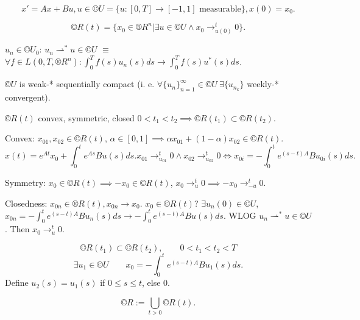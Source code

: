 \documentclass[12pt]{article}					%
\begin{document}
\begin{poznamka}
	$$ x' = Ax + Bu, u \in ©U = \{u: [0, T] \rightarrow [-1, 1] \text{ measurable}\}, x(0) = x_0. $$
\end{poznamka}

\begin{definice}
	$$ ©R(t) = \{x_0 \in ®R^n | \exists u \in ©U \land x_0 \rightarrow_{u(0)}^t 0\}. $$
\end{definice}

\begin{definice}
	$u_n \in ©U_0$: $u_n \rightharpoonup^* u \in ©U$ $≡$ $\forall f \in L(0, T, ®R^n): \int_0^T f(s) u_n(s) ds \rightarrow \int_0^T f(s) u^*(s) ds$.
\end{definice}

\begin{veta}[Alaoglu]
	$©U$ is weak-* sequentially compact (i. e. $\forall \{u_n\}_{n=1}^∞ \in ©U\ \exists \{u_{n_k}\}$ weekly-* convergent).
\end{veta}

\begin{veta}
	$©R(t)$ convex, symmetric, closed $0 < t_1 < t_2 \implies ©R(t_1) \subset ©R(t_2)$.

	\begin{dukazin}
		Convex: $x_{01}, x_{02} \in ©R(t)$, $\alpha \in [0, 1] \implies \alpha x_{01} + (1 - \alpha)x_{02} \in ©R(t)$.
		$$ x(t) = e^{At} x_0 + \int_0^t e^{As} B u(s) ds. x_{01} \rightarrow_{u_{01}}^t 0 \land x_{02} \rightarrow_{u_{02}}^t 0 \Leftrightarrow x_{0i} = -\int_0^t e^{(s - t)A} Bu_{0i}(s) ds. $$
		
		Symmetry: $x_0 \in ©R(t) \implies -x_0 \in ©R(t)$, $x_0 \rightarrow_u^t 0 \implies -x_0 \rightarrow_{-u}^t 0$.

		Closedness: $x_{0n} \in ®R(t), x_{0n} \rightarrow x_0$. $x_0 \in ©R(t)$? $\exists u_n(0) \in ©U$, $x_{0n} = - \int_0^t e^{(s - t)A} B u_n(s) ds \rightarrow - \int_0^t e^{(s - t)A} Bu(s) ds$.
		WLOG $u_n \rightharpoonup^* u \in ©U$. Then $x_0 \rightarrow_u^t 0$.

		$$ ©R(t_1) \subset ©R(t_2), \qquad 0 < t_1 < t_2 < T $$
		$$ \exists u_1 \in ©U\qquad x_0 = -\int_0^t e^{(s - t)A} Bu_1(s) ds. $$
		Define $u_2(s) = u_1(s)$ if $0 ≤ s ≤ t$, else 0.
	\end{dukazin}
\end{veta}

\begin{definice}
	$$ ©R := \bigcup_{t > 0} ©R(t). $$
\end{definice}
\end{document}
